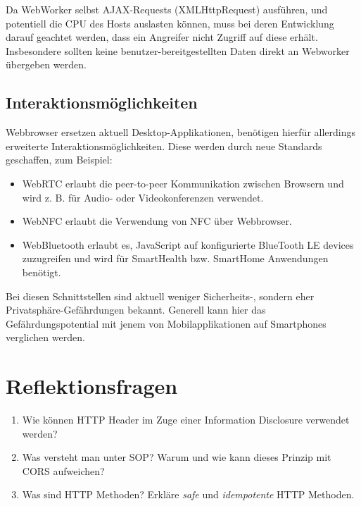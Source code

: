 Da WebWorker selbst AJAX-Requests (XMLHttpRequest) ausführen, und potentiell die CPU des Hosts auslasten können, muss bei deren Entwicklung darauf geachtet werden, dass ein Angreifer nicht Zugriff auf diese erhält. Insbesondere sollten keine benutzer-bereitgestellten Daten direkt an Webworker übergeben werden.

\subsection{Interaktionsmöglichkeiten}

Webbrowser ersetzen aktuell Desktop-Applikationen, benötigen hierfür allerdings erweiterte Interaktionsmöglichkeiten. Diese werden durch neue Standards geschaffen, zum Beispiel:

\begin{itemize}
	\item WebRTC erlaubt die peer-to-peer Kommunikation zwischen Browsern und wird z. B. für Audio- oder Videokonferenzen verwendet.
	\item WebNFC erlaubt die Verwendung von NFC über Webbrowser.
	\item WebBluetooth erlaubt es, JavaScript auf konfigurierte BlueTooth LE devices zuzugreifen und wird für SmartHealth bzw. SmartHome Anwendungen benötigt.
\end{itemize}

Bei diesen Schnittstellen sind aktuell weniger Sicherheits-, sondern eher Privatsphäre-Gefährdungen bekannt. Generell kann hier das Gefährdungspotential mit jenem von Mobilapplikationen auf Smartphones verglichen werden.

\section{Reflektionsfragen}

\begin{enumerate}
	\item Wie können HTTP Header im Zuge einer Information Disclosure verwendet werden?
	\item Was versteht man unter SOP? Warum und wie kann dieses Prinzip mit CORS aufweichen?
	\item Was sind HTTP Methoden? Erkläre \textit{safe} und \textit{idempotente} HTTP Methoden.
\end{enumerate}

